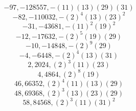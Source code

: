 \documentclass{article}
\begin{document}
\begin{dmath*}
-97,-128557,-\left(11\right) \left(13\right) \left(29\right) \left(31\right)
\end{dmath*}
\vspace{-\bigskipamount}
\begin{dmath*}
-82,-110032,-\left(2\right)^{4} \left(13\right) \left(23\right)^{2}
\end{dmath*}
\vspace{-\bigskipamount}
\begin{dmath*}
-31,-43681,-\left(11\right)^{2} \left(19\right)^{2}
\end{dmath*}
\vspace{-\bigskipamount}
\begin{dmath*}
-12,-17632,-\left(2\right)^{5} \left(19\right) \left(29\right)
\end{dmath*}
\vspace{-\bigskipamount}
\begin{dmath*}
-10,-14848,-\left(2\right)^{9} \left(29\right)
\end{dmath*}
\vspace{-\bigskipamount}
\begin{dmath*}
-4,-6448,-\left(2\right)^{4} \left(13\right) \left(31\right)
\end{dmath*}
\vspace{-\bigskipamount}
\begin{dmath*}
2,2024,\left(2\right)^{3} \left(11\right) \left(23\right)
\end{dmath*}
\vspace{-\bigskipamount}
\begin{dmath*}
4,4864,\left(2\right)^{8} \left(19\right)
\end{dmath*}
\vspace{-\bigskipamount}
\begin{dmath*}
46,66352,\left(2\right)^{4} \left(11\right) \left(13\right) \left(29\right)
\end{dmath*}
\vspace{-\bigskipamount}
\begin{dmath*}
48,69368,\left(2\right)^{3} \left(13\right) \left(23\right) \left(29\right)
\end{dmath*}
\vspace{-\bigskipamount}
\begin{dmath*}
58,84568,\left(2\right)^{3} \left(11\right) \left(31\right)^{2}
\end{dmath*}
\end{document}
